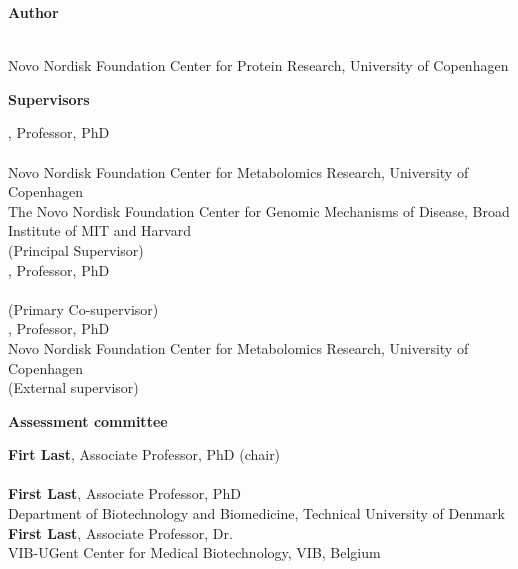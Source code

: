 \AddToShipoutPicture*{\TitleWatermark}%
\title{\thesisTitle}
\date{\thesisDate}
\maketitle
\begin{fullwidth}

  \newcommand{\affiliation}[1]{{\small #1}}
  
  \thispagestyle{empty}
  \setlength{\parindent}{0pt}
  \setlength{\parskip}{\baselineskip}
  
  {\Large \textbf{Author}}
  
  \textbf{\thesisName} \\
  \affiliation{Novo Nordisk Foundation Center for Protein Research, University of Copenhagen}

  {\Large \textbf{Supervisors}}
  
  \textbf{\thesisPrincipalSupervisor}, Professor, PhD \\
  \affiliation{\thesisMainInstitut}\\
  \affiliation{Novo Nordisk Foundation Center for Metabolomics Research, University of Copenhagen} \\
  \affiliation{The Novo Nordisk Foundation Center for Genomic Mechanisms of Disease, Broad Institute of MIT and Harvard} \\
  (Principal Supervisor)\vspace{0.4em}\\
  \textbf{\thesisCoSupervisor}, Professor, PhD \\
  \affiliation{\thesisMainInstitut} \\
  (Primary Co-supervisor) \vspace{0.4em} \\
  \textbf{\thesisExternalSupervisor}, Professor, PhD \\
  \affiliation{Novo Nordisk Foundation Center for Metabolomics Research, University of Copenhagen}\\
  (External supervisor)

  {\Large \textbf{Assessment committee}}
  
  \textbf{Firt Last}, Associate Professor, PhD (chair) \\
  \affiliation{\thesisMainInstitut}\vspace{0.4em}\\
  \textbf{First Last}, Associate Professor, PhD \\
  \affiliation{Department of Biotechnology and Biomedicine, Technical University of Denmark}\vspace{0.4em}\\
  \textbf{First Last}, Associate Professor, Dr.\\
  \affiliation{VIB-UGent Center for Medical Biotechnology, VIB, Belgium}\vspace{0.4em}\\
\end{fullwidth}